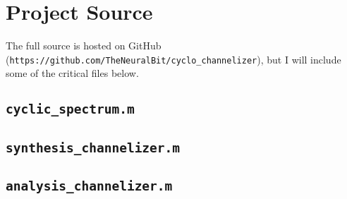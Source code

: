 \documentclass[12pt,dvips]{report}
\begin{document}

%


\chapter{Project Source}
\label{sec:source}
The full source is hosted on GitHub (\texttt{https://github.com/TheNeuralBit/cyclo\_channelizer}), but I will include some of the critical files below.

\section{\texttt{cyclic\_spectrum.m}}

\section{\texttt{synthesis\_channelizer.m}}

\section{\texttt{analysis\_channelizer.m}}

\end{document}

